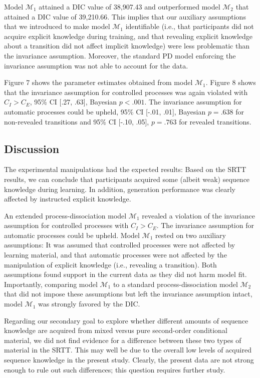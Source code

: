 \documentclass[floatsintext,man]{apa6}
\begin{document}
Model \(\mathcal{M}_1\) attained a DIC value of 38,907.43 and
outperformed model \(\mathcal{M}_2\) that attained a DIC value of
39,210.66. This implies that our auxiliary assumptions that we
introduced to make model \(\mathcal{M}_1\) identifiable (i.e., that
participants did not acquire explicit knowledge during training, and
that revealing explicit knowledge about a transition did not affect
implicit knowledge) were less problematic than the invariance
assumption. Moreover, the standard PD model enforcing the invariance
assumption was not able to account for the data.



Figure 7 shows the parameter estimates obtained from model
\(\mathcal{M}_1\). Figure 8 shows that the invariance assumption for
controlled processes was again violated with \(C_I > C_E\), 95\% CI
{[}.27, .63{]}, Bayesian \(p < .001\). The invariance assumption for
automatic processes could be upheld, 95\% CI {[}-.01, .01{]}, Bayesian
\(p = .638\) for non-revealed transitions and 95\% CI {[}-.10, .05{]},
\(p = .763\) for revealed transitions.

\subsection{Discussion}\label{discussion-1}

The experimental manipulations had the expected results: Based on the
SRTT results, we can conclude that participants acquired some (albeit
weak) sequence knowledge during learning. In addition, generation
performance was clearly affected by instructed explicit knowledge.

An extended process-dissociation model \(\mathcal{M}_1\) revealed a
violation of the invariance assumption for controlled processes with
\(C_I > C_E\). The invariance assumption for automatic processes could
be upheld. Model \(\mathcal{M}_1\) rested on two auxiliary assumptions:
It was assumed that controlled processes were not affected by learning
material, and that automatic processes were not affected by the
manipulation of explicit knowledge (i.e., revealing a transition). Both
assumptions found support in the current data as they did not harm model
fit. Importantly, comparing model \(\mathcal{M}_1\) to a standard
process-dissociation model \(\mathcal{M}_2\) that did not impose these
assumptions but left the invariance assumption intact, model
\(\mathcal{M}_1\) was strongly favored by the DIC.

Regarding our secondary goal to explore whether different amounts of
sequence knowledge are acquired from mixed versus pure second-order
conditional material, we did not find evidence for a difference between
these two types of material in the SRTT. This may well be due to the
overall low levels of acquired sequence knowledge in the present study.
Clearly, the present data are not strong enough to rule out such
differences; this question requires further study.
\end{document}
